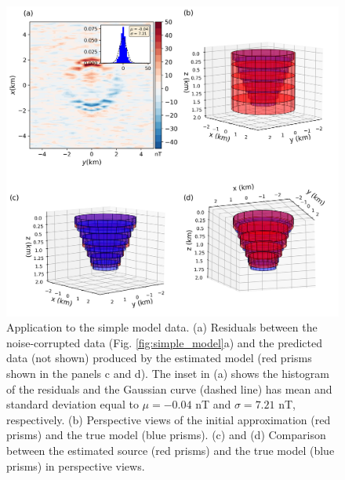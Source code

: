 
\begin{figure}
	\centering
	\includegraphics[width=\linewidth]{figures/simple_results.png}
	\caption{Application to the simple model data. (a) Residuals between the  noise-corrupted data (Fig. \ref{fig:simple_model}a) and the predicted data (not shown) produced by the estimated model (red prisms shown in the panels c and d). The inset in (a) shows the histogram of the residuals and the Gaussian curve (dashed line) has mean and standard deviation equal to $\mu = -0.04$ nT and $\sigma=7.21$ nT, respectively. (b) Perspective views of the initial approximation (red prisms) and the true model (blue prisms). (c) and (d) Comparison between the estimated source (red prisms) and the true model (blue prisms) in perspective views.}
	\label{fig:simple_results}
\end{figure}

